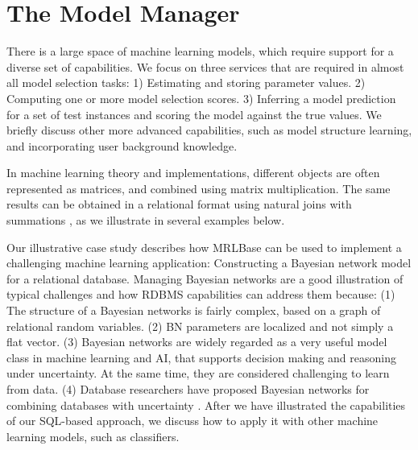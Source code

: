 \documentclass{acm_proc_article-sp}
\newcommand{\ct}{\mathit{ct}}
\begin{document}
%

\section{The Model Manager}

There is a large space of machine learning models, which require support for a diverse set of capabilities. We focus on three services that are required in almost all model selection tasks: 1) Estimating and storing parameter values. 2) Computing one or more model selection scores. 3) Inferring a model prediction for a set of test instances and scoring the model against the true values. We briefly discuss other more advanced capabilities, such as model structure learning, and incorporating user background knowledge. 

In machine learning theory and implementations, different objects are often represented as matrices, and combined using matrix multiplication. The same results can be obtained in a relational format using natural joins with summations \cite{regina}, as we illustrate in several examples below.

Our illustrative case study describes how MRLBase can be used to implement a challenging machine learning application: Constructing a Bayesian network model for a relational database. Managing Bayesian networks are a good illustration of typical challenges and how RDBMS capabilities can address them because: (1) The structure of a Bayesian networks is fairly complex, based on a graph of relational random variables. (2) BN parameters are localized and not simply a flat vector. (3) Bayesian networks are widely regarded as a very useful model class in machine learning and AI, that supports decision making and reasoning under uncertainty. At the same time, they are considered challenging to learn from data. (4) Database researchers have proposed Bayesian networks for combining databases with uncertainty \cite{bayestore,graepel}. After we have illustrated the capabilities of our SQL-based approach, we discuss how to apply it with other machine learning models, such as classifiers.
\end{document}
